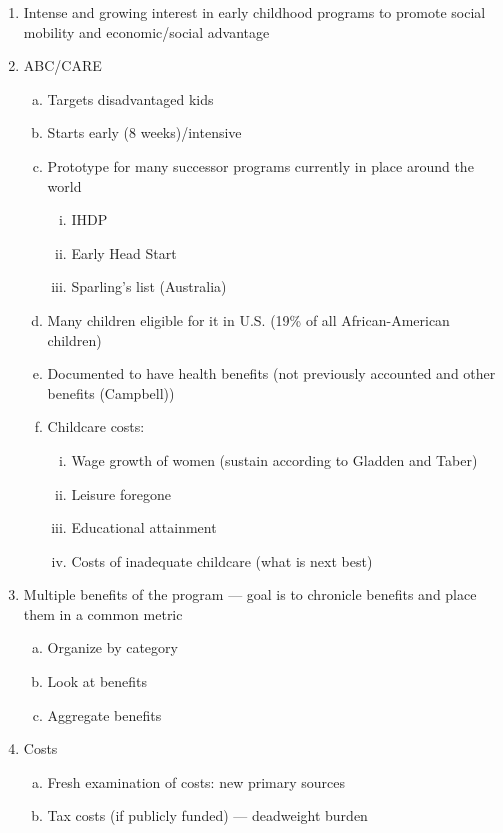 \begin{enumerate}[(1)]
\item Intense and growing interest in early childhood programs to promote social mobility and economic/social advantage
\item ABC/CARE
    \begin{enumerate}[(a)]
    \item Targets disadvantaged kids
    \item Starts early (8 weeks)/intensive
    \item Prototype for many successor programs currently in place around the world
        \begin{enumerate}[(i)]
        \item IHDP
        \item Early Head Start
        \item Sparling's list (Australia)
        \end{enumerate}
    \item Many children eligible for it in U.S. (19\% of all African-American children)
    \item Documented to have health benefits (not previously accounted and other benefits (Campbell))
    \item Childcare costs:
        \begin{enumerate}[(i)]
        \item Wage growth of women (sustain according to Gladden and Taber)
        \item Leisure foregone
        \item Educational attainment
        \item Costs of inadequate childcare (what is next best)
        \end{enumerate}
    \end{enumerate}
\item Multiple benefits of the program --- goal is to chronicle benefits and place them in a common metric
    \begin{enumerate}[(a)]
    \item Organize by category
    \item Look at benefits
    \item Aggregate benefits
    \end{enumerate}
\item Costs
    \begin{enumerate}[(a)]
    \item Fresh examination of costs: new primary sources
    \item Tax costs (if publicly funded) --- deadweight burden

\end{enumerate}
\end{enumerate}
